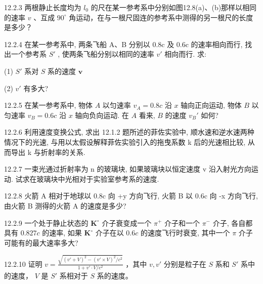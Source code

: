 \begin{problem}{12.2.3}
两根静止长度均为 $l_{0}$ 的尺在某一参考系中分别如图12.8(a)、(b)那样以相同的速率 $v$ 、互成 $90^{\circ}$ 角运动，在与一根尺固连的参考系中测得的另一根尺的长度是多少？
\begin{center}

\end{center}
\end{problem}
\clearpage


\begin{problem}{12.2.4}
在某一参考系中, 两条飞船 A、B 分别以 0.8c 及 0.6c 的速率相向而行, 找出一个参考系 $S'$ , 使两条飞船分别以相同的速率 $v'$ 相向而行. 求:

(1) $S'$ 系对 $S$ 系的速度 $\bm{v}$ 

(2) $v'$ 有多大?
\end{problem}
\clearpage


\begin{problem}{12.2.5}
在某一参考系中, 物体 $A$ 以匀速率 $v_{A} = 0.8c$ 沿 $x$ 轴向正向运动, 物体 $B$ 以匀速率 $v_{B} = 0.6c$ 沿 $x$ 轴向负向运动. 在 $A$ 看来, $B$ 的速度 $v_{B}'$ 如何?
\end{problem}
\clearpage


\begin{problem}{12.2.6}
利用速度变换公式, 求出 12.1.2 题所述的菲佐实验中, 顺水速和逆水速两种情况下的光速, 与用以太假设解释菲佐实验引入的拖曳系数 k 后的光速相比较, 从而导出 k 与折射率的关系.
\end{problem}
\clearpage


\begin{problem}{12.2.7}
一束光通过折射率为 n 的玻璃块, 如果玻璃块以恒定速度 v 沿入射光方向运动. 试求在玻璃块中光相对于实验室参考系的速度.
\end{problem}
\clearpage


\begin{problem}{12.2.8}
火箭 A 相对于地球以 0.8c 向 +y 方向飞行, 火箭 B 以 0.6c 向 -x 方向飞行, 由火箭 B 测得的火箭 A 的速度是多少?
\end{problem}
\clearpage


\begin{problem}{12.2.9}
一个处于静止状态的 $\mathbf{K}^{\circ}$ 介子衰变成一个 $\pi^{+}$ 介子和一个 $\pi^{-}$ 介子, 各自都具有 $0.827c$ 的速率, 如果 $\mathbf{K}^{\circ}$ 介子在以 $0.6c$ 的速度飞行时衰变, 其中一个 $\pi$ 介子可能有的最大速率多大?
\end{problem}
\clearpage


\begin{problem}{12.2.10}
证明 $v = \frac{\sqrt{(v' + V)^2 - (v' \times V)^2 / c^2}}{1 + v' \cdot V / c^2}$ ，其中 $v, v'$ 分别是粒子在 $S$ 系和 $S'$ 系中的速度， $V$ 是 $S'$ 系相对于 $S$ 系的速度。
\end{problem}
\clearpage


